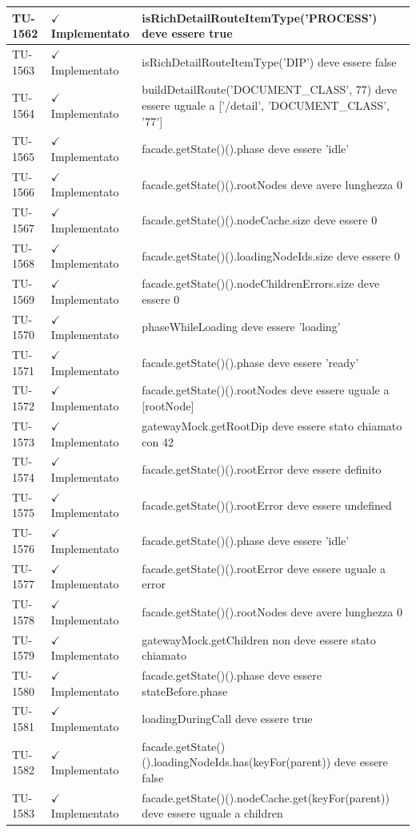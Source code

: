 ﻿\documentclass[a4paper,12pt]{article}
\newcommand{\ok}{\textcolor{green!60!black}{$\checkmark$ Implementato}}
\begin{document}
\begin{longtable}{|p{2cm}|p{3.5cm}|p{9.5cm}|}
\hline
TU-1562 & \ok & isRichDetailRouteItemType('PROCESS') deve essere true \\
\hline
TU-1563 & \ok & isRichDetailRouteItemType('DIP') deve essere false \\
\hline
TU-1564 & \ok & buildDetailRoute('DOCUMENT\_CLASS', 77) deve essere uguale a ['/detail', 'DOCUMENT\_CLASS', '77'] \\
\hline
TU-1565 & \ok & facade.getState()().phase deve essere 'idle' \\
\hline
TU-1566 & \ok & facade.getState()().rootNodes deve avere lunghezza 0 \\
\hline
TU-1567 & \ok & facade.getState()().nodeCache.size deve essere 0 \\
\hline
TU-1568 & \ok & facade.getState()().loadingNodeIds.size deve essere 0 \\
\hline
TU-1569 & \ok & facade.getState()().nodeChildrenErrors.size deve essere 0 \\
\hline
TU-1570 & \ok & phaseWhileLoading deve essere 'loading' \\
\hline
TU-1571 & \ok & facade.getState()().phase deve essere 'ready' \\
\hline
TU-1572 & \ok & facade.getState()().rootNodes deve essere uguale a [rootNode] \\
\hline
TU-1573 & \ok & gatewayMock.getRootDip deve essere stato chiamato con 42 \\
\hline
TU-1574 & \ok & facade.getState()().rootError deve essere definito \\
\hline
TU-1575 & \ok & facade.getState()().rootError deve essere undefined \\
\hline
TU-1576 & \ok & facade.getState()().phase deve essere 'idle' \\
\hline
TU-1577 & \ok & facade.getState()().rootError deve essere uguale a error \\
\hline
TU-1578 & \ok & facade.getState()().rootNodes deve avere lunghezza 0 \\
\hline
TU-1579 & \ok & gatewayMock.getChildren non deve essere stato chiamato \\
\hline
TU-1580 & \ok & facade.getState()().phase deve essere stateBefore.phase \\
\hline
TU-1581 & \ok & loadingDuringCall deve essere true \\
\hline
TU-1582 & \ok & facade.getState()().loadingNodeIds.has(keyFor(parent)) deve essere false \\
\hline
TU-1583 & \ok & facade.getState()().nodeCache.get(keyFor(parent)) deve essere uguale a children \\

\end{longtable}
\end{document}
